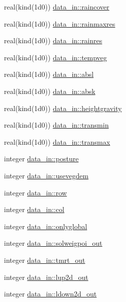 \begin{DoxyCompactItemize}
\item 
real(kind(1d0)) \hyperlink{namespacedata__in_a8a79043a75a7cba200c72ec10044bcd3}{data\+\_\+in\+::raincover}
\item 
real(kind(1d0)) \hyperlink{namespacedata__in_a2ea729731f7651be567d3392e184bf47}{data\+\_\+in\+::rainmaxres}
\item 
real(kind(1d0)) \hyperlink{namespacedata__in_aaacec9be1e147ab0d69fee857ecd57cd}{data\+\_\+in\+::rainres}
\item 
real(kind(1d0)) \hyperlink{namespacedata__in_afff1f4919ba95d947fa5e34493cc9fa3}{data\+\_\+in\+::tempveg}
\item 
real(kind(1d0)) \hyperlink{namespacedata__in_a110ac150ce724bc8739056a64c759aa0}{data\+\_\+in\+::absl}
\item 
real(kind(1d0)) \hyperlink{namespacedata__in_a3d4be49c81c1b70a22e0eee6d542cd59}{data\+\_\+in\+::absk}
\item 
real(kind(1d0)) \hyperlink{namespacedata__in_a1d9097970f09654fb90ab93ffea8d0a6}{data\+\_\+in\+::heightgravity}
\item 
real(kind(1d0)) \hyperlink{namespacedata__in_a41ecad1a8c8dc7524f1197ded67dd815}{data\+\_\+in\+::transmin}
\item 
real(kind(1d0)) \hyperlink{namespacedata__in_a22d45e9410b8efdc18d68d246d3162ce}{data\+\_\+in\+::transmax}
\item 
integer \hyperlink{namespacedata__in_acf23439514c76b06ead9eb622e0dde05}{data\+\_\+in\+::posture}
\item 
integer \hyperlink{namespacedata__in_a0d727fe2b398f97607c4ef74b9277286}{data\+\_\+in\+::usevegdem}
\item 
integer \hyperlink{namespacedata__in_adf1b4fbb82731352f1a733cb1824c4b6}{data\+\_\+in\+::row}
\item 
integer \hyperlink{namespacedata__in_a14362e5d9e2032601b72e6b50e7a338c}{data\+\_\+in\+::col}
\item 
integer \hyperlink{namespacedata__in_aa01c62f4d3c77eccd73d51c81438ac1a}{data\+\_\+in\+::onlyglobal}
\item 
integer \hyperlink{namespacedata__in_add17d78f3c3ee4dde8d1a3d9630068ca}{data\+\_\+in\+::solweigpoi\+\_\+out}
\item 
integer \hyperlink{namespacedata__in_ab2df8c3fb9195933d38aeda912642950}{data\+\_\+in\+::tmrt\+\_\+out}
\item 
integer \hyperlink{namespacedata__in_a7a7382928accd01035de817c6e632b86}{data\+\_\+in\+::lup2d\+\_\+out}
\item 
integer \hyperlink{namespacedata__in_a22e1d481d73a8409fc8c9df3ac03f209}{data\+\_\+in\+::ldown2d\+\_\+out}

\end{DoxyCompactItemize}
